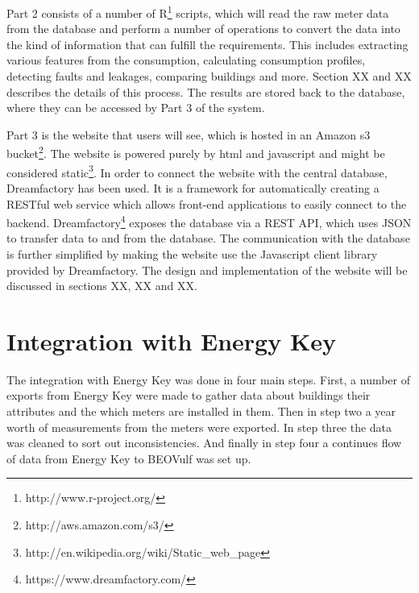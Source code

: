 Part 2 consists of a number of R\footnote{http://www.r-project.org/} scripts, which will read the raw meter data from the database and perform a number of operations to convert the data into the kind of information that can fulfill the requirements. This includes extracting various features from the consumption, calculating consumption profiles, detecting faults and leakages, comparing buildings and more. Section XX and XX describes the details of this process. The results are stored back to the database, where they can be accessed by Part 3 of the system.

Part 3 is the website that users will see, which is hosted in an Amazon s3 bucket\footnote{http://aws.amazon.com/s3/}. The website is powered purely by html and javascript and might be considered static\footnote{http://en.wikipedia.org/wiki/Static\_web\_page}. In order to connect the website with the central database, Dreamfactory has been used. It is a framework for automatically creating a RESTful web service which allows front-end applications to easily connect to the backend. Dreamfactory\footnote{https://www.dreamfactory.com/} exposes the database via a REST API, which uses JSON to transfer data to and from the database. The communication with the database is further simplified by making the website use the Javascript client library provided by Dreamfactory. The design and implementation of the website will be discussed in sections XX, XX and XX.
\section{Integration with Energy Key}
The integration with Energy Key was done in four main steps. First, a number of exports from Energy Key were made to gather data about buildings their attributes and the which meters are installed in them. Then in step two a year worth of measurements from the meters were exported. In step three the data was cleaned to sort out inconsistencies. And finally in step four a continues flow of data from Energy Key to BEOVulf was set up.
